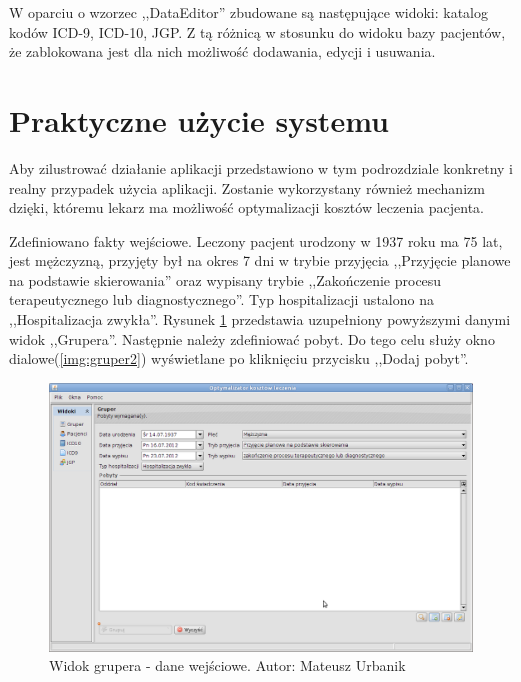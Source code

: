 W oparciu o wzorzec ,,DataEditor'' zbudowane są następujące widoki: katalog kodów ICD-9, ICD-10, JGP. Z tą różnicą w stosunku do widoku bazy pacjentów, że zablokowana jest dla nich możliwość dodawania, edycji i usuwania.


\section{Praktyczne użycie systemu}
\label{sec:praktyczneUzycieSystemu}
Aby zilustrować działanie aplikacji przedstawiono w tym podrozdziale konkretny i realny przypadek użycia aplikacji. Zostanie wykorzystany również mechanizm dzięki, któremu lekarz ma możliwość optymalizacji kosztów leczenia pacjenta.

Zdefiniowano fakty wejściowe. Leczony pacjent urodzony w 1937 roku ma 75 lat, jest mężczyzną, przyjęty był na okres 7 dni w trybie przyjęcia ,,Przyjęcie planowe na podstawie skierowania'' oraz wypisany trybie ,,Zakończenie procesu terapeutycznego lub diagnostycznego''. Typ hospitalizacji ustalono na ,,Hospitalizacja zwykła''. Rysunek \ref{img:gruper1} przedstawia uzupełniony powyższymi danymi widok ,,Grupera''. 
Następnie należy zdefiniować pobyt. Do tego celu służy okno dialowe(\ref{img:gruper2}) wyświetlane po kliknięciu przycisku ,,Dodaj pobyt''.

\begin{figure}%
\centering
\includegraphics[scale=0.4]{images/gruper1}
\caption[Widok grupera]{Widok grupera - dane wejściowe. Autor: Mateusz Urbanik}
\label{img:gruper1}
\end{figure}

